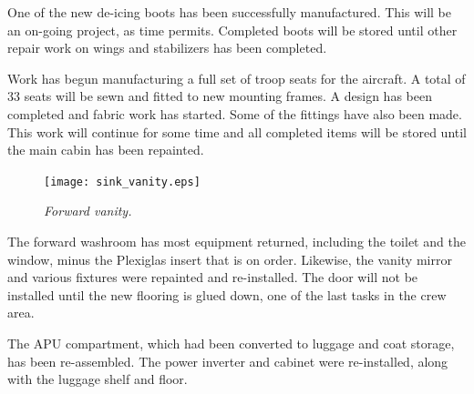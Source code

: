 One of the new de-icing boots has been successfully manufactured.
This will be an on-going project, as time permits.  Completed boots
will be stored until other repair work on wings and stabilizers has
been completed.

Work has begun manufacturing a full set of troop seats for the
aircraft.  A total of 33 seats will be sewn and fitted to new mounting
frames.  A design has been completed and fabric work has started.
Some of the fittings have also been made.  This work will continue for
some time and all completed items will be stored until the main cabin
has been repainted. 


\begin{figure}[htbp]
   \vspace{2em}
   \centering
   \texttt{[image: sink\_vanity.eps]}
   \caption*{\small \em Forward vanity.}
   \label{fig:vanity}
\end{figure}

The forward washroom has most equipment returned, including the toilet
and the window, minus the Plexiglas insert that is on order.
Likewise, the vanity mirror and various fixtures were repainted and
re-installed.  The door will not be installed until the new flooring
is glued down, one of the last tasks in the crew area.

The APU compartment, which had been converted to luggage and coat
storage, has been re-assembled.  The power inverter and cabinet were
re-installed, along with the luggage shelf and floor.




